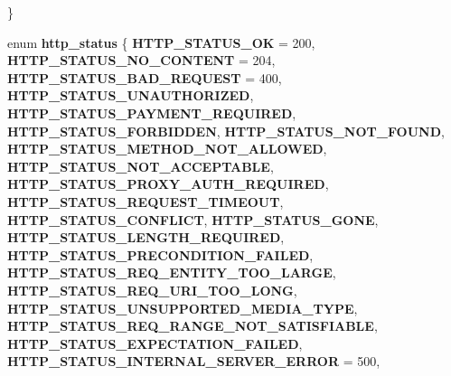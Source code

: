 \begin{DoxyCompactItemize}
 \}
\item 
\mbox{\label{group__html-chunked-substitution_gabc3b93f68c8bdd857ad32913628dfa8d}} 
enum {\bfseries http\+\_\+status} \{ \newline
{\bfseries H\+T\+T\+P\+\_\+\+S\+T\+A\+T\+U\+S\+\_\+\+OK} = 200, 
{\bfseries H\+T\+T\+P\+\_\+\+S\+T\+A\+T\+U\+S\+\_\+\+N\+O\+\_\+\+C\+O\+N\+T\+E\+NT} = 204, 
{\bfseries H\+T\+T\+P\+\_\+\+S\+T\+A\+T\+U\+S\+\_\+\+B\+A\+D\+\_\+\+R\+E\+Q\+U\+E\+ST} = 400, 
{\bfseries H\+T\+T\+P\+\_\+\+S\+T\+A\+T\+U\+S\+\_\+\+U\+N\+A\+U\+T\+H\+O\+R\+I\+Z\+ED}, 
\newline
{\bfseries H\+T\+T\+P\+\_\+\+S\+T\+A\+T\+U\+S\+\_\+\+P\+A\+Y\+M\+E\+N\+T\+\_\+\+R\+E\+Q\+U\+I\+R\+ED}, 
{\bfseries H\+T\+T\+P\+\_\+\+S\+T\+A\+T\+U\+S\+\_\+\+F\+O\+R\+B\+I\+D\+D\+EN}, 
{\bfseries H\+T\+T\+P\+\_\+\+S\+T\+A\+T\+U\+S\+\_\+\+N\+O\+T\+\_\+\+F\+O\+U\+ND}, 
{\bfseries H\+T\+T\+P\+\_\+\+S\+T\+A\+T\+U\+S\+\_\+\+M\+E\+T\+H\+O\+D\+\_\+\+N\+O\+T\+\_\+\+A\+L\+L\+O\+W\+ED}, 
\newline
{\bfseries H\+T\+T\+P\+\_\+\+S\+T\+A\+T\+U\+S\+\_\+\+N\+O\+T\+\_\+\+A\+C\+C\+E\+P\+T\+A\+B\+LE}, 
{\bfseries H\+T\+T\+P\+\_\+\+S\+T\+A\+T\+U\+S\+\_\+\+P\+R\+O\+X\+Y\+\_\+\+A\+U\+T\+H\+\_\+\+R\+E\+Q\+U\+I\+R\+ED}, 
{\bfseries H\+T\+T\+P\+\_\+\+S\+T\+A\+T\+U\+S\+\_\+\+R\+E\+Q\+U\+E\+S\+T\+\_\+\+T\+I\+M\+E\+O\+UT}, 
{\bfseries H\+T\+T\+P\+\_\+\+S\+T\+A\+T\+U\+S\+\_\+\+C\+O\+N\+F\+L\+I\+CT}, 
\newline
{\bfseries H\+T\+T\+P\+\_\+\+S\+T\+A\+T\+U\+S\+\_\+\+G\+O\+NE}, 
{\bfseries H\+T\+T\+P\+\_\+\+S\+T\+A\+T\+U\+S\+\_\+\+L\+E\+N\+G\+T\+H\+\_\+\+R\+E\+Q\+U\+I\+R\+ED}, 
{\bfseries H\+T\+T\+P\+\_\+\+S\+T\+A\+T\+U\+S\+\_\+\+P\+R\+E\+C\+O\+N\+D\+I\+T\+I\+O\+N\+\_\+\+F\+A\+I\+L\+ED}, 
{\bfseries H\+T\+T\+P\+\_\+\+S\+T\+A\+T\+U\+S\+\_\+\+R\+E\+Q\+\_\+\+E\+N\+T\+I\+T\+Y\+\_\+\+T\+O\+O\+\_\+\+L\+A\+R\+GE}, 
\newline
{\bfseries H\+T\+T\+P\+\_\+\+S\+T\+A\+T\+U\+S\+\_\+\+R\+E\+Q\+\_\+\+U\+R\+I\+\_\+\+T\+O\+O\+\_\+\+L\+O\+NG}, 
{\bfseries H\+T\+T\+P\+\_\+\+S\+T\+A\+T\+U\+S\+\_\+\+U\+N\+S\+U\+P\+P\+O\+R\+T\+E\+D\+\_\+\+M\+E\+D\+I\+A\+\_\+\+T\+Y\+PE}, 
{\bfseries H\+T\+T\+P\+\_\+\+S\+T\+A\+T\+U\+S\+\_\+\+R\+E\+Q\+\_\+\+R\+A\+N\+G\+E\+\_\+\+N\+O\+T\+\_\+\+S\+A\+T\+I\+S\+F\+I\+A\+B\+LE}, 
{\bfseries H\+T\+T\+P\+\_\+\+S\+T\+A\+T\+U\+S\+\_\+\+E\+X\+P\+E\+C\+T\+A\+T\+I\+O\+N\+\_\+\+F\+A\+I\+L\+ED}, 
\newline
{\bfseries H\+T\+T\+P\+\_\+\+S\+T\+A\+T\+U\+S\+\_\+\+I\+N\+T\+E\+R\+N\+A\+L\+\_\+\+S\+E\+R\+V\+E\+R\+\_\+\+E\+R\+R\+OR} = 500, 

\end{DoxyCompactItemize}
